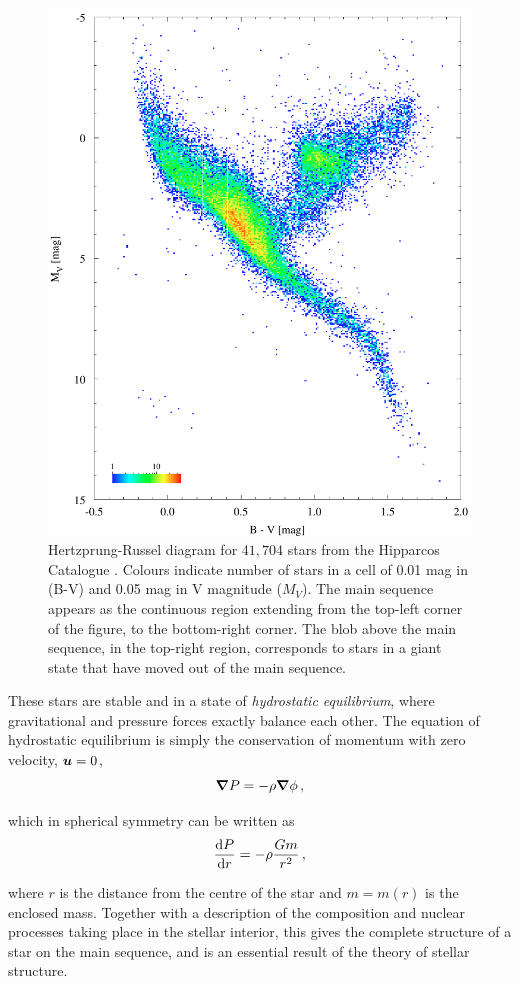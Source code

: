 \begin{figure}[ht!]
    \centering
    \includegraphics[width=0.75\linewidth]{figures/hr-hip.pdf}
    \caption{Hertzprung-Russel diagram for \(41{,}704\) stars from the Hipparcos Catalogue \citep{Perryman1997}. Colours indicate number of stars in a cell of 0.01 mag in (B-V) and 0.05 mag in V magnitude (\(M_V\)). The main sequence appears as the continuous region extending from the top-left corner of the figure, to the bottom-right corner. The blob above the main sequence, in the top-right region, corresponds to stars in a giant state that have moved out of the main sequence.}
    \label{fig:hr}
\end{figure}

These stars are stable and in a state of \emph{hydrostatic equilibrium}, where gravitational and pressure forces exactly balance each other. The equation of hydrostatic equilibrium is simply the conservation of momentum with zero velocity, \(\boldsymbol{u} = 0\),
\begin{equation}
    \boldsymbol{\nabla} P = - \rho \boldsymbol{\nabla} \phi \,\mathrm{,}
\end{equation}

which in spherical symmetry can be written as
\begin{equation}
    \frac{\mathrm{d}\mathrm{} P}{\mathrm{d}\mathrm{} r} = - \rho \frac{Gm}{r^2} \,\mathrm{,}
\end{equation}

where \(r\) is the distance from the centre of the star and \(m = m(r)\) is the enclosed mass. Together with a description of the composition and nuclear processes taking place in the stellar interior, this gives the complete structure of a star on the main sequence, and is an essential result of the theory of stellar structure.

